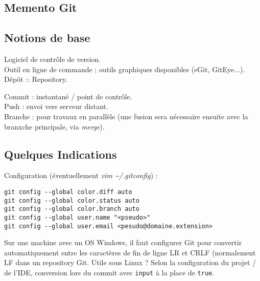 \documentclass[11pt,twoside,a4paper]{article}
\begin{document}
\begin{landscape}



\begin{multicols}{2}
	\section*{Memento Git}
	
	\subsection*{Notions de base}
	
	Logiciel de contr{\^o}le de version. ~\\
	
	Outil en ligne de commande ; outils graphiques disponibles (eGit, GitEye...). ~\\
	
	D{\'e}p{\^o}t :: Repository. 
	
	Commit : instantan{\'e} / point de contr{\^o}le.  ~\\
	Push : envoi vers serveur distant.  ~\\
	Branche : pour travaux en parall{\`e}le (une fusion sera n{\'e}cessaire ensuite avec la branxche principale, via \emph{merge}).  ~\\
	
	\subsection*{Quelques Indications}
	
	Configuration ({\'e}ventuellement \emph{vim \textasciitilde{}/.gitconfig}) : 
	
	\begin{verbatim}
git config --global color.diff auto
git config --global color.status auto
git config --global color.branch auto
git config --global user.name "<pseudo>"
git config --global user.email <pesudo@domaine.extension>
	\end{verbatim}
	

Sur une machine avec un OS Windows, il faut configurer Git pour convertir automatiquement entre les caractères de fin de ligne LR et CRLF (normalement LF dans un repository Git. Utile sous Linux ? Selon la configuration du projet / de l'IDE, conversion lors du commit avec \texttt{input} à la place de \texttt{true}. 


\end{multicols}
\end{landscape}
\end{document}
